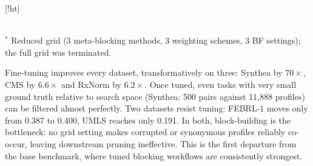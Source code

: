 \documentclass[runningheads]{llncs}
\makeatletter
\renewenvironment{table}
  {\setlength\abovecaptionskip{0\p@}%
   \setlength\belowcaptionskip{7\p@}%
   \@float{table}}
  {\end@float}
\makeatother
\begin{document}
\begin{table}[!ht]
\centering
\caption{Blocking workflows on medical datasets: parameter-free (PF) vs.\ fine-tuned (FT),
with the best grid-search configuration. BF = block filtering ratio, WEP = Weighted Edge
Pruning, RCNP = Reciprocal Cardinality Node Pruning.}
\label{tab:medical-blocking}
\vspace{2pt}
\\ \footnotesize $^{*}$ Reduced grid (3 meta-blocking methods, 3 weighting schemes, 3 BF
settings); the full grid was terminated.
\end{table}

Fine-tuning improves every dataset, transformatively on three: Synthea by $70\times$, CMS by
$6.6\times$ and RxNorm by $6.2\times$. Once tuned, even tasks with very small ground truth
relative to search space (Synthea: 500 pairs against 11{,}888 profiles) can be filtered almost perfectly. Two datasets resist tuning: FEBRL-1 moves only from 0.387 to 0.400, UMLS reaches only 0.191. In both, block-building is the bottleneck: no grid setting makes corrupted or synonymous profiles reliably co-occur, leaving downstream pruning ineffective. This is the first departure from the base benchmark, where tuned blocking workflows are consistently strongest.
\end{document}
